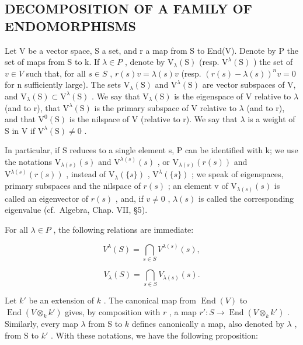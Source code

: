 \subsection{DECOMPOSITION OF A FAMILY OF ENDOMORPHISMS}

Let V be a vector space, S a set, and r a map from S to End(V). Denote by P the set of maps from S to k. If \(\lambda \in P\) , denote by \(\mathrm{V}_{\lambda}(\mathrm{S})\) (resp. \(\mathrm{V}^{\lambda}(\mathrm{S})\) ) the set of \(v \in V\) such that, for all \(s \in S\) , \(r(s)v = \lambda(s)v\) (resp. \((r(s) - \lambda(s))^{n}v = 0\) for n sufficiently large). The sets \(\mathrm{V}_{\lambda}(\mathrm{S})\) and \(\mathrm{V}^{\lambda}(\mathrm{S})\) are vector subspaces of V, and \(\mathrm{V}_{\lambda}(\mathrm{S}) \subset \mathrm{V}^{\lambda}(\mathrm{S})\) . We say that \(\mathrm{V}_{\lambda}(\mathrm{S})\) is the eigenspace of V relative to \(\lambda\) (and to r), that \(\mathrm{V}^{\lambda}(\mathrm{S})\) is the primary subspace of V relative to \(\lambda\) (and to r), and that \(\mathrm{V}^{0}(\mathrm{S})\) is the nilspace of V (relative to r). We say that \(\lambda\) is a weight of S in V if \(\mathrm{V}^{\lambda}(\mathrm{S}) \neq 0\) .

In particular, if S reduces to a single element s, P can be identified with k; we use the notations \(\mathrm{V}_{\lambda(s)}(s)\) and \(\mathrm{V}^{\lambda(s)}(s)\) , or \(\mathrm{V}_{\lambda(s)}(r(s))\) and \(\mathrm{V}^{\lambda(s)}(r(s))\) , instead of \(\mathrm{V}_{\lambda}(\{s\})\) , \(\mathrm{V}^{\lambda}(\{s\})\) ; we speak of eigenspaces, primary subspaces and the nilspace of \(r(s)\) ; an element v of \(\mathrm{V}_{\lambda(s)}(s)\) is called an eigenvector of \(r(s)\) , and, if \(v \neq 0\) , \(\lambda(s)\) is called the corresponding eigenvalue (cf.~Algebra, Chap. VII, §5).

For all \(\lambda\in P\) , the following relations are immediate:

\[
V ^ {\lambda} (S) = \bigcap_ {s \in S} V ^ {\lambda (s)} (s),\tag{1}
\]

\[
V _ {\lambda} (S) = \bigcap_ {s \in S} V _ {\lambda (s)} (s).\tag{2}
\]

Let \(k'\) be an extension of \(k\) . The canonical map from \(\operatorname{End}(V)\) to \(\operatorname{End}(V \otimes_k k')\) gives, by composition with \(r\) , a map \(r' : S \to \operatorname{End}(V \otimes_k k')\) . Similarly, every map \(\lambda\) from S to \(k\) defines canonically a map, also denoted by \(\lambda\) , from S to \(k'\) . With these notations, we have the following proposition:

